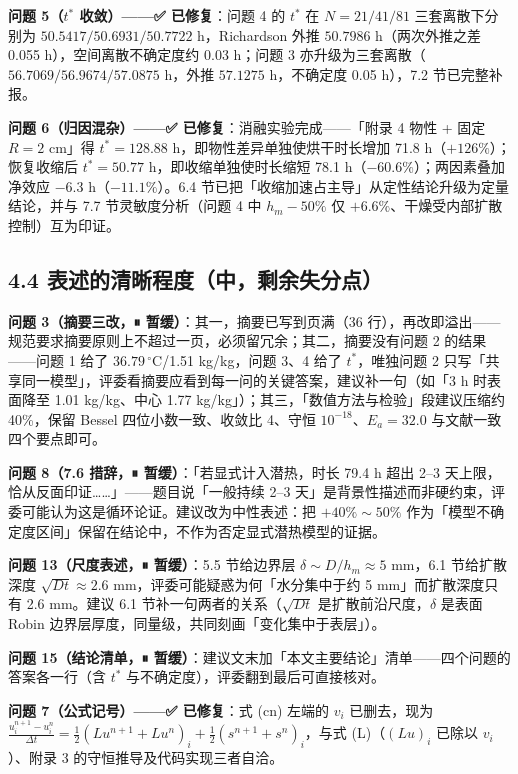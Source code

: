 \documentclass[12pt,a4paper]{ctexart}
\begin{document}
\textbf{问题 5（$t^*$ 收敛）——✅ 已修复}：问题 4 的 $t^*$ 在 $N=21/41/81$ 三套离散下分别为 $50.5417/50.6931/50.7722$ h，Richardson 外推 $50.7986$ h（两次外推之差 0.055 h），空间离散不确定度约 0.03 h；问题 3 亦升级为三套离散（$56.7069/56.9674/57.0875$ h，外推 $57.1275$ h，不确定度 0.05 h），7.2 节已完整补报。

\textbf{问题 6（归因混杂）——✅ 已修复}：消融实验完成——「附录 4 物性 + 固定 $R=2$ cm」得 $t^*=128.88$ h，即物性差异单独使烘干时长增加 71.8 h（$+126\%$）；恢复收缩后 $t^*=50.77$ h，即收缩单独使时长缩短 78.1 h（$-60.6\%$）；两因素叠加净效应 $-6.3$ h（$-11.1\%$）。6.4 节已把「收缩加速占主导」从定性结论升级为定量结论，并与 7.7 节灵敏度分析（问题 4 中 $h_m-50\%$ 仅 $+6.6\%$、干燥受内部扩散控制）互为印证。

\subsection{4.4 表述的清晰程度（中，剩余失分点）}

\textbf{问题 3（摘要三改，⏸ 暂缓）}：其一，摘要已写到页满（36 行），再改即溢出——规范要求摘要原则上不超过一页，必须留冗余；其二，摘要没有问题 2 的结果——问题 1 给了 $36.79\,^\circ$C/1.51 kg/kg，问题 3、4 给了 $t^*$，唯独问题 2 只写「共享同一模型」，评委看摘要应看到每一问的关键答案，建议补一句（如「3 h 时表面降至 1.01 kg/kg、中心 1.77 kg/kg」）；其三，「数值方法与检验」段建议压缩约 40\%，保留 Bessel 四位小数一致、收敛比 4、守恒 $10^{-18}$、$E_a=32.0$ 与文献一致四个要点即可。

\textbf{问题 8（7.6 措辞，⏸ 暂缓）}：「若显式计入潜热，时长 79.4 h 超出 2--3 天上限，恰从反面印证……」——题目说「一般持续 2--3 天」是背景性描述而非硬约束，评委可能认为这是循环论证。建议改为中性表述：把 $+40\%\sim50\%$ 作为「模型不确定度区间」保留在结论中，不作为否定显式潜热模型的证据。

\textbf{问题 13（尺度表述，⏸ 暂缓）}：5.5 节给边界层 $\delta\sim D/h_m\approx5$ mm，6.1 节给扩散深度 $\sqrt{Dt}\approx2.6$ mm，评委可能疑惑为何「水分集中于约 5 mm」而扩散深度只有 2.6 mm。建议 6.1 节补一句两者的关系（$\sqrt{Dt}$ 是扩散前沿尺度，$\delta$ 是表面 Robin 边界层厚度，同量级，共同刻画「变化集中于表层」）。

\textbf{问题 15（结论清单，⏸ 暂缓）}：建议文末加「本文主要结论」清单——四个问题的答案各一行（含 $t^*$ 与不确定度），评委翻到最后可直接核对。

\textbf{问题 7（公式记号）——✅ 已修复}：式 (cn) 左端的 $v_i$ 已删去，现为 $\frac{u_i^{n+1}-u_i^n}{\Delta t}=\frac12(Lu^{n+1}+Lu^n)_i+\frac12(s^{n+1}+s^n)_i$，与式 (L)（$(Lu)_i$ 已除以 $v_i$）、附录 3 的守恒推导及代码实现三者自洽。
\end{document}
